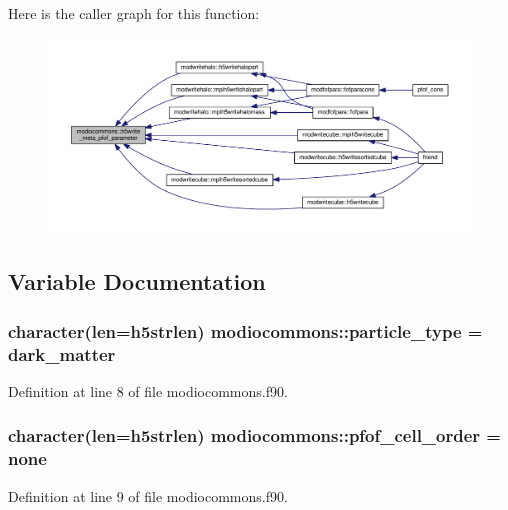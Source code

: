 Here is the caller graph for this function\+:\nopagebreak
\begin{figure}[H]
\begin{center}
\leavevmode
\includegraphics[width=350pt]{namespacemodiocommons_a27eabdb687af381e608f120d19dfa997_icgraph}
\end{center}
\end{figure}




\subsection{Variable Documentation}
\subsubsection[{\texorpdfstring{particle\+\_\+type}{particle_type}}]{\setlength{\rightskip}{0pt plus 5cm}character(len=h5strlen) modiocommons\+::particle\+\_\+type = \textquotesingle{}dark\+\_\+matter\textquotesingle{}}\hypertarget{namespacemodiocommons_a4633abb26c30930181f911f19ff14d48}{}\label{namespacemodiocommons_a4633abb26c30930181f911f19ff14d48}


Definition at line 8 of file modiocommons.\+f90.

\subsubsection[{\texorpdfstring{pfof\+\_\+cell\+\_\+order}{pfof_cell_order}}]{\setlength{\rightskip}{0pt plus 5cm}character(len=h5strlen) modiocommons\+::pfof\+\_\+cell\+\_\+order = \textquotesingle{}none\textquotesingle{}}\hypertarget{namespacemodiocommons_af6e5c22c5b9117c05a89375348ba830f}{}\label{namespacemodiocommons_af6e5c22c5b9117c05a89375348ba830f}


Definition at line 9 of file modiocommons.\+f90.

